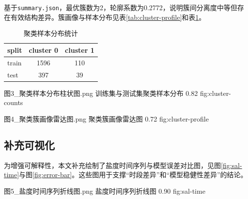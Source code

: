 基于\texttt{summary.json}，最优簇数为2，轮廓系数为0.2772，说明簇间分离度中等但存在有效结构差异。簇画像与样本分布见表\ref{tab:cluster-profile}和表\ref{tab:cluster-counts}。

\begin{table}[htbp]
    \centering
    \caption{聚类簇画像（天级特征均值）}
    \label{tab:cluster-profile}
\end{table}

\begin{table}[htbp]
    \centering
    \caption{聚类样本分布统计}
    \label{tab:cluster-counts}
    \begin{tabular}{lcc}
        \toprule
        split & cluster 0 & cluster 1 \\
        \midrule
        train & 1596 & 110 \\
        test & 397 & 39 \\
        \bottomrule
    \end{tabular}
\end{table}

            {图3_聚类样本分布柱状图.png}
            {训练集与测试集聚类样本分布}
            {0.82}
            {fig:cluster-counts}

            {图4_聚类簇画像雷达图.png}
            {聚类簇画像雷达图}
            {0.72}
            {fig:cluster-profile}

\subsection{补充可视化}

为增强可解释性，本文补充绘制了盐度时间序列与模型误差对比图，见图\ref{fig:sal-time}与图\ref{fig:error-bar}。这些图用于支撑“时段差异”和“模型稳健性差异”的结论。

            {图5_盐度时间序列折线图.png}
            {盐度时间序列折线图}
            {0.90}
            {fig:sal-time}

